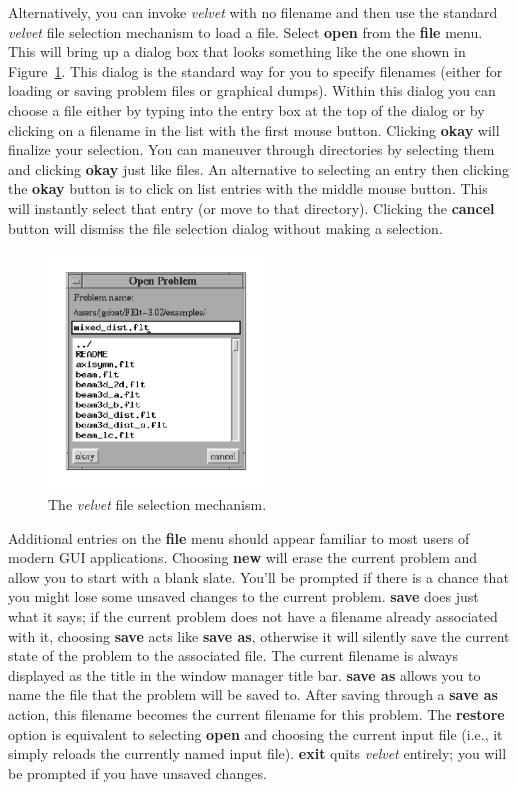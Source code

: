 Alternatively, you can invoke {\em velvet} with no filename and then use 
the standard {\em velvet} file selection mechanism to load a file.
Select {\bf open} from the {\bf file} menu.  This will bring up a dialog
box that looks something like the one shown in Figure~\ref{velvet.file}.  
This dialog
is the standard way for you to specify filenames (either for loading or 
saving problem files or graphical dumps).  Within this dialog you
can choose a file either by typing into the entry box at the top of
the dialog or by clicking on a filename in the list with the first mouse
button.  Clicking {\bf okay} will finalize your selection.  You can 
maneuver through directories by selecting them and clicking {\bf okay}
just like files.  
An alternative to selecting an entry then clicking the {\bf okay} button 
is to click on list entries with the middle mouse button.  This will instantly 
select that entry (or move to that directory).  Clicking the {\bf cancel}
button will dismiss the file selection dialog without making a selection.

\begin{figure}
\begin{center}
 \includegraphics[width=2.25in]{figures/velvet_file}
\end{center}
\caption{The {\em velvet} file selection mechanism.}
\label{velvet.file}
\end{figure}

Additional entries on the {\bf file} menu should appear familiar to
most users of modern GUI applications.  Choosing {\bf new} will erase
the current problem and allow you to start with a blank slate.  You'll
be prompted if there is a chance that you might lose some unsaved changes
to the current problem.  {\bf save} does just what it says; if the current
problem does not have a filename already associated with it, choosing
{\bf save} acts like {\bf save as}, otherwise it will silently save
the current state of the problem to the associated file.  The current filename
is always displayed as the title in the window manager title bar. 
{\bf save as} allows you to name the file that the problem will be saved to.
After saving through a {\bf save as} action, this filename becomes the
current filename for this problem.  The {\bf restore} option is equivalent
to selecting {\bf open} and choosing the current input file (i.e., it simply
reloads the currently named input file).  {\bf exit} quits {\em velvet}
entirely; you will be prompted if you have unsaved changes.

